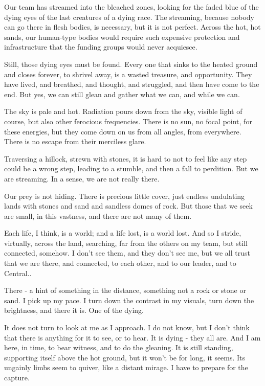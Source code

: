 
Our team has streamed into the bleached zones, looking for the faded
blue of the dying eyes of the last creatures of a dying race. The
streaming, because nobody can go there in flesh bodies, is necessary,
but it is not perfect. Across the hot, hot sands, our human-type bodies
would require such expensive protection and infrastructure that the
funding groups would never acquiesce.

Still, those dying eyes must be found. Every one that sinks to the
heated ground and closes forever, to shrivel away, is a wasted treasure,
and opportunity. They have lived, and breathed, and thought, and
struggled, and then have come to the end. But yes, we can still glean
and gather what we can, and while we can.

The sky is pale and hot. Radiation pours down from the sky, visible
light of course, but also other ferocious frequencies. There is no sun,
no focal point, for these energies, but they come down on us from all
angles, from everywhere. There is no escape from their merciless glare.

Traversing a hillock, strewn with stones, it is hard to not to feel like
any step could be a wrong step, leading to a stumble, and then a fall to
perdition. But we are streaming. In a sense, we are not really there.

Our prey is not hiding. There is precious little cover, just endless
undulating lands with stones and sand and sandless domes of rock. But
those that we seek are small, in this vastness, and there are not many
of them.

Each life, I think, is a world; and a life lost, is a world lost. And so
I stride, virtually, across the land, searching, far from the others on
my team, but still connected, somehow. I don't see them, and they don't
see me, but we all trust that we are there, and connected, to each
other, and to our leader, and to Central..

There - a hint of something in the distance, something not a rock or
stone or sand. I pick up my pace. I turn down the contrast in my
visuals, turn down the brightness, and there it is. One of the dying.

It does not turn to look at me as I approach. I do not know, but I don't
think that there is anything for it to see, or to hear. It is dying -
they all are. And I am here, in time, to bear witness, and to do the
gleaning. It is still standing, supporting itself above the hot ground,
but it won't be for long, it seems. Its ungainly limbs seem to quiver,
like a distant mirage. I have to prepare for the capture.

